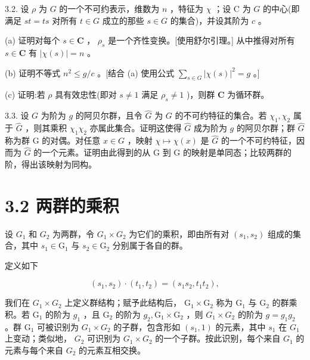 \documentclass[10pt]{article}
\begin{document}
3.2. 设 \(\rho\) 为 \(G\) 的一个不可约表示，维数为 \(n\) ，特征为 \(\chi\) ；设 C 为 \(G\) 的中心(即满足 \({st} = {ts}\) 对所有 \(t \in  G\) 成立的那些 \(s \in  G\) 的集合)，并设其阶为 \(c\) 。

(a) 证明对每个 \(s \in  \mathbf{C}\) ， \({\rho }_{s}\) 是一个齐性变换。[使用舒尔引理。] 从中推得对所有 \(s \in  \mathbf{C}\) 有 \(\left| {\chi \left( s\right) }\right|  = n\) 。

(b) 证明不等式 \({n}^{2} \leq  g/c\) 。[结合 (a) 使用公式 \(\mathop{\sum }\limits_{{s \in  G}}{\left| \chi \left( s\right) \right| }^{2} = g\) 。]

(c) 证明:若 \(\rho\) 具有效忠性(即对 \(s \neq  1\) 满足 \({\rho }_{s} \neq  1\) )，则群 \(\mathbf{C}\) 为循环群。

3.3. 设 \(G\) 为阶为 \(g\) 的阿贝尔群，且令 \(\widehat{G}\) 为 \(G\) 的不可约特征的集合。若 \({\chi }_{1},{\chi }_{2}\) 属于 \(\widehat{G}\) ，则其乘积 \({\chi }_{1}{\chi }_{2}\) 亦属此集合。证明这使得 \(\widehat{G}\) 成为阶为 \(g\) 的阿贝尔群；群 \(\widehat{G}\) 称为群 G 的对偶。对任意 \(x \in  G\) ，映射 \(\chi  \mapsto  \chi \left( x\right)\) 是 \(\widehat{G}\) 的一个不可约特征，因而为 \(\widehat{G}\) 的一个元素。证明由此得到的从 G 到 G 的映射是单同态；比较两群的阶，得出该映射为同构。

\section*{3.2 两群的乘积}

设 \({G}_{1}\) 和 \({G}_{2}\) 为两群，令 \({G}_{1} \times  {G}_{2}\) 为它们的乘积，即由所有对 \(\left( {{s}_{1},{s}_{2}}\right)\) 组成的集合，其中 \({s}_{1} \in  {\mathrm{G}}_{1}\) 与 \({s}_{2} \in  {\mathrm{G}}_{2}\) 分别属于各自的群。

定义如下

\[
\left( {{s}_{1},{s}_{2}}\right)  \cdot  \left( {{t}_{1},{t}_{2}}\right)  = \left( {{s}_{1}{s}_{2},{t}_{1}{t}_{2}}\right) ,
\]

我们在 \({G}_{1} \times  {G}_{2}\) 上定义群结构；赋予此结构后， \({\mathrm{G}}_{1} \times  {\mathrm{G}}_{2}\) 称为 \({\mathrm{G}}_{1}\) 与 \({\mathrm{G}}_{2}\) 的群乘积。若 \({\mathrm{G}}_{1}\) 的阶为 \({g}_{1}\) ，且 \({\mathrm{G}}_{2}\) 的阶为 \({g}_{2},{\mathrm{G}}_{1} \times  {\mathrm{G}}_{2}\) ，则 \({G}_{1} \times  {G}_{2}\) 的阶为 \(g = {g}_{1}{g}_{2}\) 。群 \({\mathrm{G}}_{1}\) 可被识别为 \({G}_{1} \times  {G}_{2}\) 的子群，包含形如 \(\left( {{s}_{1},1}\right)\) 的元素，其中 \({s}_{1}\) 在 \({G}_{1}\) 上变动；类似地， \({G}_{2}\) 可识别为 \({G}_{1} \times  {G}_{2}\) 的一个子群。按此识别，每个来自 \({G}_{1}\) 的元素与每个来自 \({G}_{2}\) 的元素互相交换。
\end{document}
